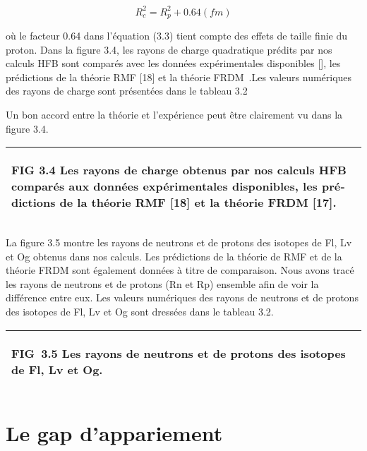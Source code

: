  \begin{equation} R_c^2=R_p^2+0.64(\mathit{fm})\end{equation} 

où le facteur 0.64 dans l’équation (3.3) tient compte des effets de taille finie du proton. Dans la figure 3.4, les rayons de charge quadratique prédits par nos calculs HFB sont comparés avec les données expérimentales disponibles [], les prédictions de la théorie RMF [18] et la théorie FRDM~.Les valeurs numériques des rayons de charge sont présentées dans le tableau 3.2

Un bon accord entre la théorie et l’expérience peut être clairement vu dans la figure 3.4. 

\begin{flushleft}
\tablefirsthead{}
\tablehead{}
\tabletail{}
\tablelasttail{}
\begin{supertabular}{|m{6.40316in}|}
\hline
{\begin{french} FIG 3.4 Les rayons de charge obtenus par nos calculs HFB comparés aux données expérimentales disponibles, les prédictions de la théorie RMF [18] et la théorie FRDM [17].\end{french}}\\\hline
\end{supertabular}
\end{flushleft}
La figure 3.5 montre les rayons de neutrons et de protons des isotopes de Fl, Lv et Og obtenus dans nos calculs. Les prédictions de la théorie de RMF et de la théorie FRDM sont également données à titre de comparaison. Nous  avons tracé les rayons de neutrons et de protons (Rn et Rp) ensemble afin de voir la différence entre eux. Les valeurs numériques des rayons de neutrons et de protons des isotopes de Fl, Lv et Og sont dressées dans le tableau 3.2.

\begin{flushleft}
\tablefirsthead{}
\tablehead{}
\tabletail{}
\tablelasttail{}
\begin{supertabular}{|m{6.22476in}|}
\hline
{\begin{french} FIG~3.5 Les rayons de neutrons et de protons des isotopes de Fl, Lv et Og.\end{french}}

\\\hline
\end{supertabular}
\end{flushleft}
\section{Le gap d’appariement}

